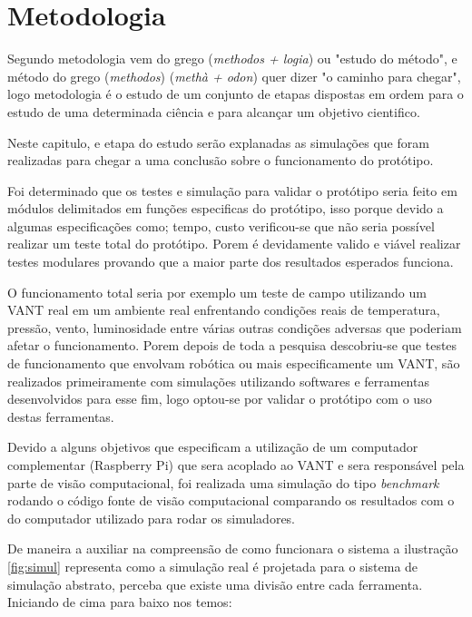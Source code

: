 \chapter{Metodologia}\label{cap:metodologia}
Segundo \cite{metodologia} metodologia vem do grego (\textit{methodos + logia}) ou "estudo do método", e método do grego (\textit{methodos}) (\textit{methà + odon}) quer dizer "o caminho para chegar", logo metodologia é o estudo de um conjunto de etapas dispostas em ordem para o estudo de uma determinada ciência e para alcançar um objetivo cientifico.

Neste capitulo, e etapa do estudo serão explanadas as simulações que foram realizadas para chegar a uma conclusão sobre o funcionamento do protótipo.

Foi determinado que os testes e simulação para validar o protótipo seria feito em módulos delimitados em funções especificas do protótipo, isso porque devido a algumas especificações como; tempo, custo verificou-se que não seria possível realizar um teste total do protótipo. Porem é devidamente valido e viável realizar testes modulares provando que a maior parte dos resultados esperados funciona. 

O funcionamento total seria por exemplo um teste de campo utilizando um VANT real em um ambiente real enfrentando condições reais de temperatura, pressão, vento, luminosidade entre várias outras condições adversas que poderiam afetar o funcionamento. Porem depois de toda a pesquisa descobriu-se que testes de funcionamento que envolvam robótica ou mais especificamente um VANT, são realizados primeiramente com simulações utilizando softwares e ferramentas desenvolvidos para esse fim, logo optou-se por validar o protótipo com o uso destas ferramentas. 

Devido a alguns objetivos que especificam a utilização de um computador complementar (Raspberry Pi) que sera acoplado ao VANT e sera responsável pela parte de visão computacional, foi realizada uma simulação do tipo \textit{benchmark} rodando o código fonte de visão computacional comparando os resultados com o do computador utilizado para rodar os simuladores. 

De maneira a auxiliar na compreensão de como funcionara o sistema a ilustração \ref{fig:simul} representa como a simulação real é projetada para o sistema de simulação abstrato, perceba que existe uma divisão entre cada ferramenta. Iniciando de cima para baixo nos temos:

